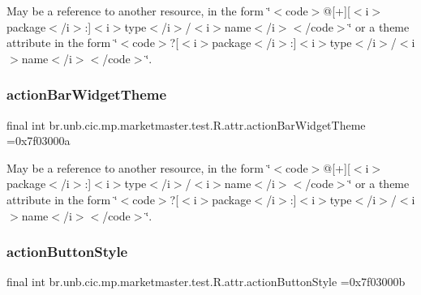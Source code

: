 May be a reference to another resource, in the form \char`\"{}$<$code$>$@\mbox{[}+\mbox{]}\mbox{[}$<$i$>$package$<$/i$>$\+:\mbox{]}$<$i$>$type$<$/i$>$/$<$i$>$name$<$/i$>$$<$/code$>$\char`\"{} or a theme attribute in the form \char`\"{}$<$code$>$?\mbox{[}$<$i$>$package$<$/i$>$\+:\mbox{]}$<$i$>$type$<$/i$>$/$<$i$>$name$<$/i$>$$<$/code$>$\char`\"{}. \mbox{\label{classbr_1_1unb_1_1cic_1_1mp_1_1marketmaster_1_1test_1_1R_1_1attr_a063c18febb1da5ef77ccea81f33ab8b9}} 
\subsubsection{\texorpdfstring{action\+Bar\+Widget\+Theme}{actionBarWidgetTheme}}
{\footnotesize\ttfamily final int br.\+unb.\+cic.\+mp.\+marketmaster.\+test.\+R.\+attr.\+action\+Bar\+Widget\+Theme =0x7f03000a\hspace{0.3cm}{\ttfamily [static]}}

May be a reference to another resource, in the form \char`\"{}$<$code$>$@\mbox{[}+\mbox{]}\mbox{[}$<$i$>$package$<$/i$>$\+:\mbox{]}$<$i$>$type$<$/i$>$/$<$i$>$name$<$/i$>$$<$/code$>$\char`\"{} or a theme attribute in the form \char`\"{}$<$code$>$?\mbox{[}$<$i$>$package$<$/i$>$\+:\mbox{]}$<$i$>$type$<$/i$>$/$<$i$>$name$<$/i$>$$<$/code$>$\char`\"{}. \mbox{\label{classbr_1_1unb_1_1cic_1_1mp_1_1marketmaster_1_1test_1_1R_1_1attr_a8754dd3d2fac2bf0a9fe84918c7ae49d}} 
\subsubsection{\texorpdfstring{action\+Button\+Style}{actionButtonStyle}}
{\footnotesize\ttfamily final int br.\+unb.\+cic.\+mp.\+marketmaster.\+test.\+R.\+attr.\+action\+Button\+Style =0x7f03000b\hspace{0.3cm}{\ttfamily [static]}}

